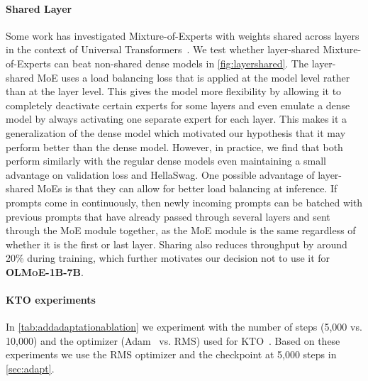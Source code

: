 \documentclass{article}
\newcommand{\modelsmall}{\textbf{\textsc{OLMoE-1B-7B}}}
\begin{document}
\paragraph{Shared Layer} Some work has investigated Mixture-of-Experts with weights shared across layers in the context of Universal Transformers~\citep{tan2023sparse,csordás2024moeut,dehghani2019universaltransformers}. We test whether layer-shared Mixture-of-Experts can beat non-shared dense models in \autoref{fig:layershared}. The layer-shared MoE uses a load balancing loss that is applied at the model level rather than at the layer level. This gives the model more flexibility by allowing it to completely deactivate certain experts for some layers and even emulate a dense model by always activating one separate expert for each layer. This makes it a generalization of the dense model which motivated our hypothesis that it may perform better than the dense model. However, in practice, we find that both perform similarly with the regular dense models even maintaining a small advantage on validation loss and HellaSwag. One possible advantage of layer-shared MoEs is that they can allow for better load balancing at inference. If prompts come in continuously, then newly incoming prompts can be batched with previous prompts that have already passed through several layers and sent through the MoE module together, as the MoE module is the same regardless of whether it is the first or last layer. Sharing also reduces throughput by around 20\% during training, which further motivates our decision not to use it for \modelsmall{}.

\paragraph{KTO experiments} In \autoref{tab:addadaptationablation} we experiment with the number of steps (5,000 vs. 10,000) and the optimizer (Adam~\citep{kingma2017adam} vs. RMS) used for KTO~\citep{ethayarajh2024kto}. Based on these experiments we use the RMS optimizer and the checkpoint at 5,000 steps in \autoref{sec:adapt}.
\end{document}
